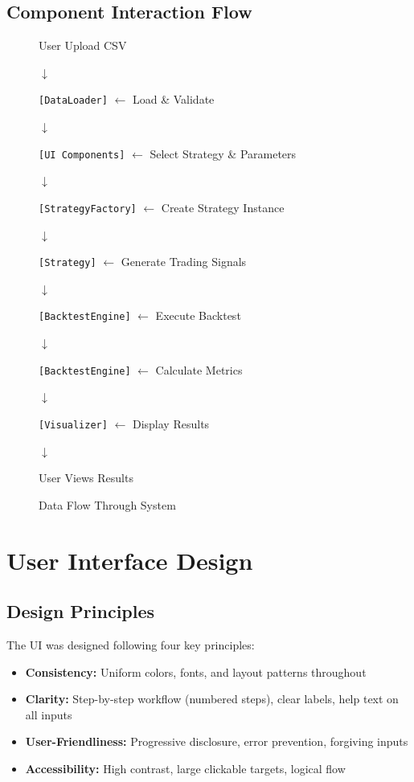 \documentclass[11pt,a4paper]{article}
\begin{document}
\subsection{Component Interaction Flow}

\begin{figure}[H]
\centering
\begin{minipage}{0.7\textwidth}
\centering
User Upload CSV

$\downarrow$

\texttt{[DataLoader]} $\leftarrow$ Load \& Validate

$\downarrow$

\texttt{[UI Components]} $\leftarrow$ Select Strategy \& Parameters

$\downarrow$

\texttt{[StrategyFactory]} $\leftarrow$ Create Strategy Instance

$\downarrow$

\texttt{[Strategy]} $\leftarrow$ Generate Trading Signals

$\downarrow$

\texttt{[BacktestEngine]} $\leftarrow$ Execute Backtest

$\downarrow$

\texttt{[BacktestEngine]} $\leftarrow$ Calculate Metrics

$\downarrow$

\texttt{[Visualizer]} $\leftarrow$ Display Results

$\downarrow$

User Views Results
\end{minipage}
\caption{Data Flow Through System}
\end{figure}

\newpage
\section{User Interface Design}

\subsection{Design Principles}

The UI was designed following four key principles:

\begin{itemize}
    \item \textbf{Consistency:} Uniform colors, fonts, and layout patterns throughout
    \item \textbf{Clarity:} Step-by-step workflow (numbered steps), clear labels, help text on all inputs
    \item \textbf{User-Friendliness:} Progressive disclosure, error prevention, forgiving inputs
    \item \textbf{Accessibility:} High contrast, large clickable targets, logical flow
\end{itemize}
\end{document}
